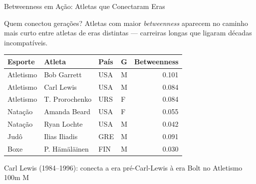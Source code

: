 \begin{frame}[shrink=12]{Betweenness em Ação: Atletas que Conectaram Eras}
    \begin{block}{Quem conectou gerações?}
        \footnotesize
        Atletas com maior \textit{betweenness} aparecem no caminho mais curto entre atletas de eras distintas --- carreiras longas que ligaram décadas incompatíveis.
    \end{block}

    \vspace{0.2cm}

    \begin{center}
    \footnotesize
    \begin{tabular}{llllr}
    \toprule
    \textbf{Esporte} & \textbf{Atleta} & \textbf{País} & \textbf{G} & \textbf{Betweenness} \\
    \midrule
    Atletismo & Bob Garrett          & USA & M & 0.101 \\
    Atletismo & Carl Lewis            & USA & M & 0.084 \\
    Atletismo & T. Prorochenko       & URS & F & 0.084 \\
    Natação   & Amanda Beard         & USA & F & 0.055 \\
    Natação   & Ryan Lochte          & USA & M & 0.042 \\
    Judô      & Ilias Iliadis         & GRE & M & 0.091 \\
    Boxe      & P. Hämäläinen        & FIN & M & 0.030 \\
    \bottomrule
    \end{tabular}
    \end{center}

    \vspace{0.2cm}

    \begin{alertblock}{}
        \footnotesize\centering
        Carl Lewis (1984--1996): conecta a era pré-Carl-Lewis à era Bolt no Atletismo 100m M
    \end{alertblock}
\end{frame}
